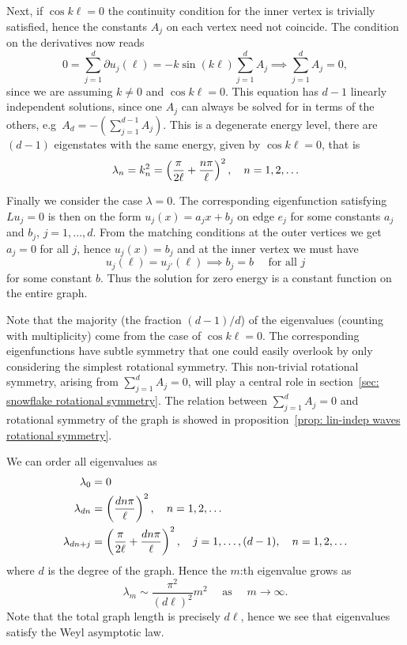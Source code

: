 Next, if $\cos k\ell = 0$ the continuity condition for the inner vertex is trivially satisfied, hence the constants $A_j$ on each vertex need not coincide. The condition on the derivatives now reads
\[
  0 = \sum_{j=1}^{d} \partial u_j(\ell) = - k \sin(k\ell) \sum_{j=1}^{d} A_j \implies \sum_{j=1}^{d} A_j = 0,
\]
since we are assuming $k \ne 0$ and $\cos k\ell = 0$. This equation has $d-1$ linearly independent solutions, since one $A_j$ can always be solved for in terms of the others, e.g\ $A_d = -(\sum_{j=1}^{d-1} A_j)$. This is a degenerate energy level, there are $(d-1)$ eigenstates with the same energy, given by $\cos k\ell = 0$, that is
\[
  \lambda_n = k_n^2 = \left(\frac{\pi}{2\ell} + \frac{n\pi}{\ell}\right)^2, \quad n = 1, 2, \ldots
\]

Finally we consider the case $\lambda = 0$. The corresponding eigenfunction satisfying $Lu_j = 0$ is then on the form $u_j(x) = a_jx + b_j$ on edge $e_j$ for some constants $a_j$ and $b_j$, $j=1,\ldots,d$. From the matching conditions at the outer vertices we get $a_j = 0$ for all $j$, hence $u_j(x) = b_j$ and at the inner vertex we must have
\[
  u_j(\ell) = u_{j'}(\ell) \implies b_j = b \quad \text{ for all } j
\]
for some constant $b$. Thus the solution for zero energy is a constant function on the entire graph.

Note that the majority (the fraction $(d-1)/d$) of the eigenvalues (counting with multiplicity) come from the case of $\cos k\ell = 0$. The corresponding eigenfunctions have subtle symmetry that one could easily overlook by only considering the simplest rotational symmetry. This non-trivial rotational symmetry, arising from $\sum_{j=1}^{d} A_j = 0$, will play a central role in section~\ref{sec: snowflake rotational symmetry}. The relation between $\sum_{j=1}^{d} A_j = 0$ and rotational symmetry of the graph is showed in proposition~\ref{prop: lin-indep waves rotational symmetry}.

We can order all eigenvalues as
\begin{align*}
  \lambda_0 &= 0 \\
  \lambda_{dn} &= \left(\frac{dn\pi}{\ell}\right)^2, \quad n = 1,2,\ldots \\
  \lambda_{dn+j} &= \left(\frac{\pi}{2\ell} + \frac{dn\pi}{\ell}\right)^2, \quad j = 1,\ldots,(d-1), \quad n = 1,2,\ldots
\end{align*}
where $d$ is the degree of the graph.
Hence the $m$:th eigenvalue grows as
\[
  \lambda_m \sim \frac{\pi^2}{(d\ell)^2}m^2 \quad \text{ as } \quad m \to \infty.
\]
Note that the total graph length is precisely $d\ell$, hence we see that eigenvalues satisfy the Weyl asymptotic law.




